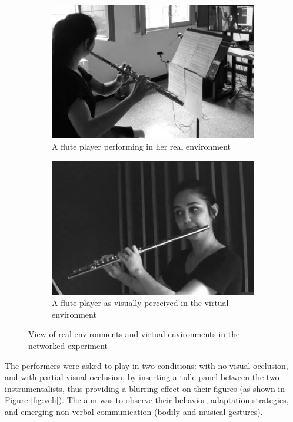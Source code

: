 \documentclass[conference]{IEEEtran}
\begin{document}
\begin{figure}[t]
\begin{subfigure}[t]{.48\columnwidth}
		\includegraphics[width=\textwidth]{img/fs.eps}
		\caption{A flute player performing in her real environment}
		\label{subfig:fs}
	\end{subfigure}
	\begin{subfigure}[t]{.48\columnwidth}
		\centering        
		\includegraphics[width=\textwidth]{img/fv.eps}
		\caption{A flute player as visually perceived in the virtual environment}
		\label{subfig:fv}
	\end{subfigure}
	
	\quad 
	\caption{View of real environments and virtual environments in the networked experiment}\label{fig:afsv}
	
\end{figure}

The performers were asked to play in two conditions: with no visual occlusion, and with partial visual occlusion, by inserting a tulle panel between the two instrumentalists, thus providing a blurring effect on their figures (as shown in Figure \ref{fig:veli}). The aim was to observe their behavior, adaptation strategies, and emerging non-verbal communication (bodily and musical gestures).
\end{document}
